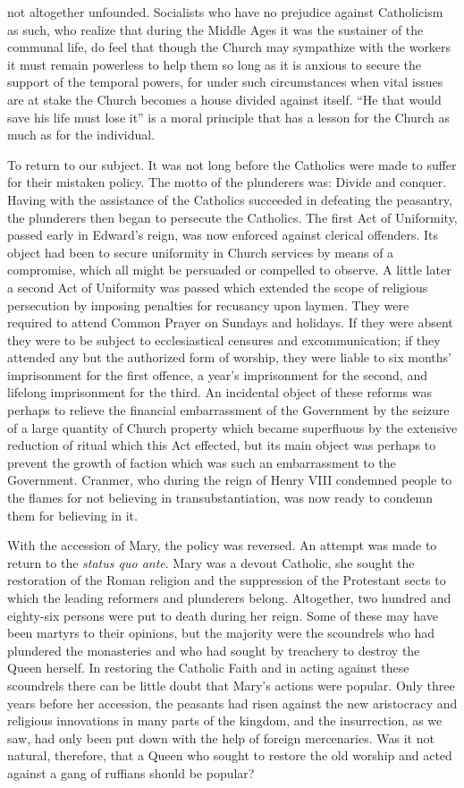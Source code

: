 \documentclass{book}
\begin{document}
not altogether unfounded. Socialists who have no prejudice against Catholicism as such, who realize that during the Middle Ages it was the sustainer of the communal life, do feel that though the Church may sympathize with the workers it must remain powerless to help them so long as it is anxious to secure the support of the temporal powers, for under such circumstances when vital issues are at stake the Church becomes a house divided against itself. “He that would save his life must lose it” is a moral principle that has a lesson for the Church as much as for the individual.

To return to our subject. It was not long before the Catholics were made to suffer for their mistaken policy. The motto of the plunderers was: Divide and conquer. Having with the assistance of the Catholics succeeded in defeating the peasantry, the plunderers then began to persecute the Catholics. The first Act of Uniformity, passed early in Edward’s reign, was now enforced against clerical offenders. Its object had been to secure uniformity in Church services by means of a compromise, which all might be persuaded or compelled to observe. A little later a second Act of Uniformity was passed which extended the scope of religious persecution by imposing penalties for recusancy upon laymen. They were required to attend Common Prayer on Sundays and holidays. If they were absent they were to be subject to ecclesiastical censures and excommunication; if they attended any but the authorized form of worship, they were liable to six months’ imprisonment for the first offence, a year’s imprisonment for the second, and lifelong imprisonment for the third. An incidental object of these reforms was perhaps to relieve the financial embarrassment of the Government by the seizure of a large quantity of Church property which became superfluous by the extensive reduction of ritual which this Act effected, but its main object was perhaps to prevent the growth of faction which was such an embarrassment to the Government. Cranmer, who during the reign of Henry VIII condemned people to the flames for not believing in transubstantiation, was now ready to condemn them for believing in it.

With the accession of Mary, the policy was reversed. An attempt was made to return to the \emph{status quo ante}. Mary was a devout Catholic, she sought the restoration of the Roman religion and the suppression of the Protestant sects to which the leading reformers and plunderers belong. Altogether, two hundred and eighty-six persons were put to death during her reign. Some of these may have been martyrs to their opinions, but the majority were the scoundrels who had plundered the monasteries and who had sought by treachery to destroy the Queen herself. In restoring the Catholic Faith and in acting against these scoundrels there can be little doubt that Mary’s actions were popular. Only three years before her accession, the peasants had risen against the new aristocracy and religious innovations in many parts of the kingdom, and the insurrection, as we saw, had only been put down with the help of foreign mercenaries. Was it not natural, therefore, that a Queen who sought to restore the old worship and acted against a gang of ruffians should be popular?
\end{document}
